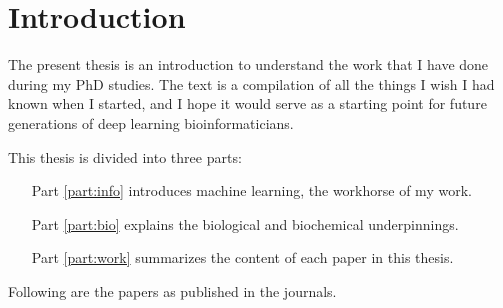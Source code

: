 \chapter{Introduction}

The present thesis is an introduction to understand the work that I have done during my PhD studies.
The text is a compilation of all the things I wish I had known when I started, and I hope it would serve as a starting point for future generations of deep learning bioinformaticians.


This thesis is divided into three parts:

\begin{itemize}
	\item[Part \ref{part:info}] introduces machine learning, the workhorse of my work.
	\item[Part \ref{part:bio}] explains the biological and biochemical underpinnings.
	\item[Part \ref{part:work}] summarizes the content of each paper in this thesis.
\end{itemize}

Following are the papers as published in the journals.
